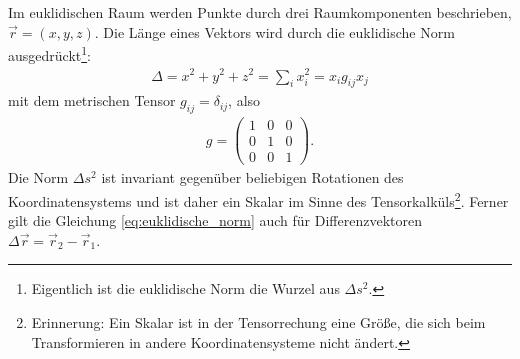 Im euklidischen Raum werden Punkte durch drei Raumkomponenten beschrieben, $\vec r=(x,y,z)$.
Die Länge eines Vektors wird durch die euklidische Norm ausgedrückt\footnote{Eigentlich ist die euklidische Norm die Wurzel aus $\Delta s^2$.}:
\begin{align}
    \label{eq:euklidische_norm}
    \Delta=x^2+y^2+z^2=\sum_i x_i^2=x_ig_{ij}x_j
\end{align}
mit dem metrischen Tensor $g_{ij}=\delta_{ij}$, also
\begin{align*}
    g = \begin{pmatrix}
            1 & 0 & 0 \\
            0 & 1 & 0 \\
            0 & 0 & 1
        \end{pmatrix}.
\end{align*}
Die Norm $\Delta s^2$ ist invariant gegenüber beliebigen Rotationen des Koordinatensystems und ist daher ein Skalar im Sinne des Tensorkalküls\footnote{Erinnerung: Ein Skalar ist in der Tensorrechung eine Größe, die sich beim Transformieren in andere Koordinatensysteme nicht ändert. }.
Ferner gilt die Gleichung \eqref{eq:euklidische_norm} auch für Differenzvektoren $\Delta\vec r=\vec r_2-\vec r_1$.


